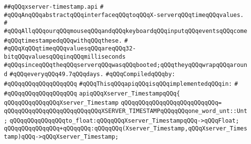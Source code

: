 \label{src/lib/x-kit/xclient/src/wire/xserver-timestamp.api}
\verb|##qQQqxserver-timestamp.api|\newline
\verb|#|\newline
\verb|#qQQqAnqQQqabstractqQQqinterfaceqQQqtoqQQqX-serverqQQqtimeqQQqvalues.|\newline
\verb|#|\newline
\verb|#qQQqAllqQQqourqQQqmouseqQQqandqQQqkeyboardqQQqinputqQQqeventsqQQqcome|\newline
\verb|#qQQqtimestampedqQQqwithqQQqthese.|\newline
\verb|#|\newline
\verb|#qQQqXqQQqtimeqQQqvaluesqQQqareqQQq32-bitqQQqvaluesqQQqinqQQqmilliseconds|\newline
\verb|#qQQqsinceqQQqtheqQQqserverqQQqwasqQQqbooted;qQQqtheyqQQqwrapqQQqaround|\newline
\verb|#qQQqeveryqQQq49.7qQQqdays.|\newline
\newline
\verb|#qQQqCompiledqQQqby:|\newline
\verb|#qQQqqQQqqQQqqQQqqQQq|\newline
\newline
\newline
\newline
\newline
\verb|#qQQqThisqQQqapiqQQqisqQQqimplementedqQQqin:|\newline
\verb|#|\newline
\verb|#qQQqqQQqqQQqqQQqqQQq|\newline
\newline
\verb|apiqQQqXserver_TimestampqQQq{|\newline
\newline
\verb|qQQqqQQqqQQqqQQqXserver_Timestamp|\newline
\verb|qQQqqQQqqQQqqQQqqQQqqQQqqQQq=|\newline
\verb|qQQqqQQqqQQqqQQqqQQqqQQqqQQqXSERVER_TIMESTAMPqQQqqQQqone_word_unt::Unt;|\newline
\newline
\verb|qQQqqQQqqQQqqQQqto_float:qQQqqQQqXserver_TimestampqQQq->qQQqFloat;|\newline
\newline
\verb|qQQqqQQqqQQqqQQq+qQQqqQQq:qQQqqQQq(Xserver_Timestamp,qQQqXserver_Timestamp)qQQq->qQQqXserver_Timestamp;|\newline
